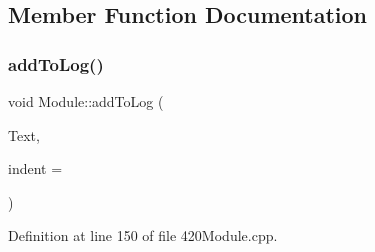 \subsection{Member Function Documentation}
\mbox{\label{class_module_a5dfb18333a2943155a7fd6a4602e00a7}} 
\subsubsection{\texorpdfstring{add\+To\+Log()}{addToLog()}\hspace{0.1cm}{\footnotesize\ttfamily [1/4]}}
{\footnotesize\ttfamily void Module\+::add\+To\+Log (\begin{DoxyParamCaption}\item[{const \+\_\+\+\_\+\+Flash\+String\+Helper $\ast$}]{Text,  }\item[{byte}]{indent = {} }\end{DoxyParamCaption})}



Definition at line 150 of file 420\+Module.\+cpp.

